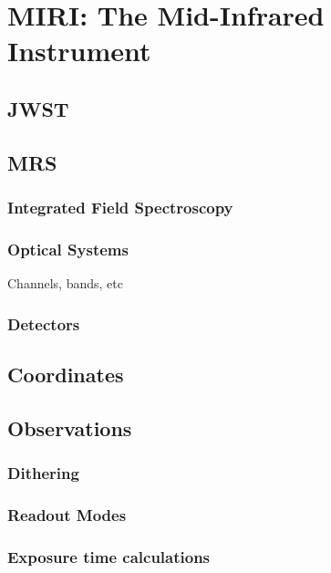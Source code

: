 \chapter{MIRI: The Mid-Infrared Instrument}
\section{JWST}
\section{MRS}
\subsection{Integrated Field Spectroscopy}
\subsection{Optical Systems}
Channels, bands, etc \cite{ref:Chen2019}
\subsection{Detectors}
\section{Coordinates}
\section{Observations}
\subsection{Dithering}
\subsection{Readout Modes}
\subsection{Exposure time calculations}
